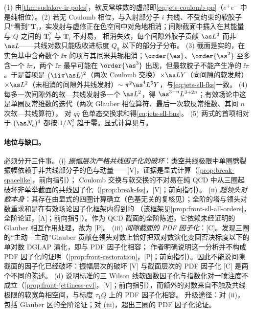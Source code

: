 \begin{proofsketch}
(1) 由\cref{thm:sudakov-ir-poles}，软反常维数的虚部即\cref{eq:jets-coulomb-pp}（$e^+e^-$ 中是纯相位）。(2) 若无 Coulomb 相位，与入射部分子 $i$ 共线、不受约束的软胶子只“看到”$\bm T_i$，实发射与虚修正在色空间中对角地相消；间隙截面中插入在其能量与 $Q$ 之间的 $\bm T_t^2$ 与 $\bm T_i$ 不对易，
相消失效，每个间隙外胶子贡献 $\as L^2$ 而非 $\as L$——共线对数只能吸收进标度 $Q_0$ 以下的部分子分布\cite{ForshawKyrieleisSeymour2006}。
(3) 截面是实的，在实色基中含奇数个 $\ii\pi$ 的项与其厄米共轭相消；$\order{\as}$、$\order{\as^2}$ 至多含一个 $\ii\pi$，两个 $\ii\pi$ 最早可能在 $\order{\as^3}$ 出现，但最软胶子不能产生净的 $\ii\pi$\cite{ForshawKyrieleisSeymour2006}。于是首项是 $(\ii\pi\as L)^2$（两次 Coulomb 交换）$\times\as LY$（向间隙的软发射）$\times\as L^2$（未相消的间隙外共线发射）$\sim\pi^2\as^4L^5Y$，与\cref{eq:jets-sll-fks}一致。
(4) 每多一次间隙外的软—共线发射多一个 $\as L^2$，得 $\as^{3+n}L^{3+2n}$；有效场论中这是单圈反常维数的迭代（两次 Glauber 相位算符、最后一次软反常维数、其间 $n$ 次软—共线算符\cite{Becher:2021zkk}），
对 $q\bar q$ 色单态交换求和得\cref{eq:jets-sll-bns}。
(5) 两式的首项相对于 $(\as N_c)^4$ 都按 $1/N_c^2$ 趋于零。显式计算见\cite[第~3~节]{ForshawKyrieleisSeymour2006}与\cite{Forshaw:2008cq}。
\end{proofsketch}

\paragraph{地位与缺口。}
必须分开三件事。(i) \emph{振幅层次严格共线因子化的破坏}：类空共线极限中单圈劈裂振幅依赖于非共线部分子的色与动量——[V]，证据是显式计算（\cref{prop:break-spacelike}，前向指引）；
Coulomb 交换与软交换的不对易在纯 QCD 中从三圈起破坏非单举截面的共线因子化（\cref{prop:break-fss}，[V]；前向指引）。
(ii) \emph{超领头对数本身}：其存在由显式的四圈计算确立\cite{ForshawKyrieleisSeymour2006}（色基无关的复核见\cite{Forshaw:2008cq}）；全阶的塔与领头对数重求和是在有效场论因子化框架内得到的
\cite{Becher:2021zkk,Becher:2023mtx,Boer:2024hzh,Becher:2024nqc}（该框架见\cref{prop:front-sll-all-orders}，全阶论证，[A]；前向指引）。作为 QCD 截面的全阶陈述，它依赖未经证明的 Glauber 相互作用处理，故为 [P]。
(iii) \emph{间隙截面的 PDF 因子化}：[C]。\cite{Becher:2024kmk}发现三圈的“主动—主动”Glauber 贡献在领头对数上恰好把双对数演化变回否决标度以下的单对数 DGLAP 演化，即与 PDF 因子化相容；
作者明确说明这一分析并不构成 PDF 因子化的证明（\cref{prop:front-restoration}，[P]；前向指引）。因此不能说间隙截面的因子化已经破坏：振幅层次的破坏 [V] 与截面层次的 PDF 因子化 [C] 是两个不同的陈述。
(d) 说明标准的三 Wilson 线软函数因子化与指数化对一喷注度不成立（\cref{prop:front-jettiness-cvl}，[V]；前向指引），而额外的对数来自不触及共线极限的软宽角相空间，与标度 $\tau_1Q$ 上的 PDF 因子化相容\cite{Banfi:2025mra}。
升级途径：对 (ii)，包括 Glauber 区的全阶论证；对 (iii)，超出三圈的 PDF 因子化论证。

